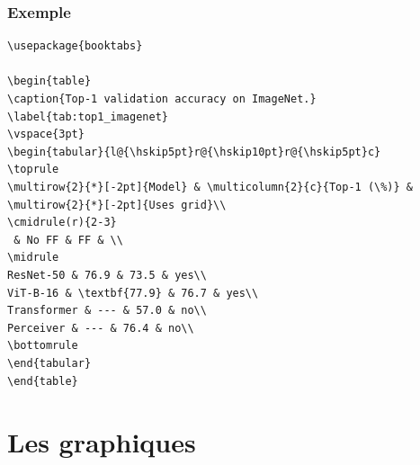 \documentclass[aspectratio=169]{beamer}
\begin{document}
\begin{frame}[fragile]\frametitle{Exemple}
\vspace{-5mm}

\scriptsize
\begin{verbatim}
\usepackage{booktabs}

\begin{table}
\caption{Top-1 validation accuracy on ImageNet.}
\label{tab:top1_imagenet}
\vspace{3pt}
\begin{tabular}{l@{\hskip5pt}r@{\hskip10pt}r@{\hskip5pt}c}
\toprule
\multirow{2}{*}[-2pt]{Model} & \multicolumn{2}{c}{Top-1 (\%)} & \multirow{2}{*}[-2pt]{Uses grid}\\
\cmidrule(r){2-3}
 & No FF & FF & \\
\midrule
ResNet-50 & 76.9 & 73.5 & yes\\
ViT-B-16 & \textbf{77.9} & 76.7 & yes\\
Transformer & --- & 57.0 & no\\
Perceiver & --- & 76.4 & no\\
\bottomrule
\end{tabular}
\end{table}
\end{verbatim}

\end{frame}





















\section{Les graphiques}
\label{sec:les_graphiques}
\end{document}
